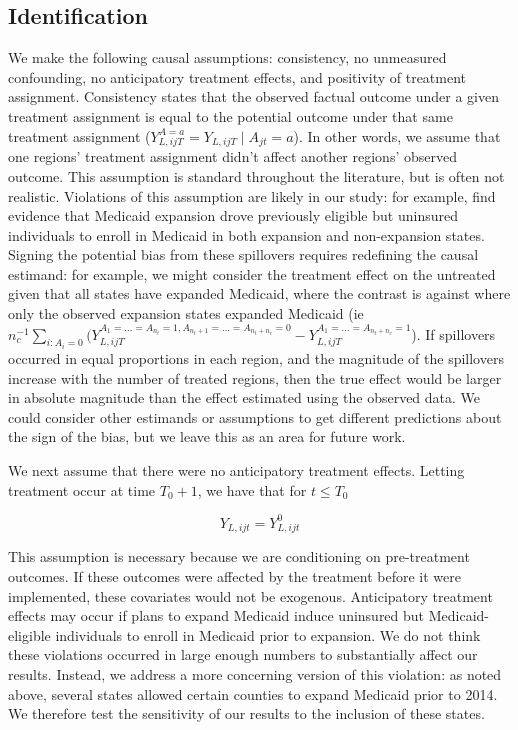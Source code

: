 \documentclass[12pt]{article}
\begin{document}
\subsection{Identification}

We make the following causal assumptions: consistency, no unmeasured confounding, no anticipatory treatment effects, and positivity of treatment assignment. Consistency states that the observed factual outcome under a given treatment assignment is equal to the potential outcome under that same treatment assignment ($Y_{L, ijT}^{A = a} = Y_{L, ijT} \mid A_{jt} = a$). In other words, we assume that one regions' treatment assignment didn't affect another regions' observed outcome. This assumption is standard throughout the literature, but is often not realistic. Violations of this assumption are likely in our study: for example, \cite{frean2017premium} find evidence that Medicaid expansion drove previously eligible but uninsured individuals to enroll in Medicaid in both expansion and non-expansion states. Signing the potential bias from these spillovers requires redefining the causal estimand: for example, we might consider the treatment effect on the untreated given that all states have expanded Medicaid, where the contrast is against where only the observed expansion states expanded Medicaid (ie $n_c^{-1}\sum_{i: A_i = 0}(Y_{L, ijT}^{A_1 = ... = A_{n_t} = 1, A_{n_t + 1} = ... = A_{n_t + n_c} = 0} - Y_{L, ijT}^{A_1 = ... = A_{n_t + n_c} = 1}$). If spillovers occurred in equal proportions in each region, and the magnitude of the spillovers increase with the number of treated regions, then the true effect would be larger in absolute magnitude than the effect estimated using the observed data. We could consider other estimands or assumptions to get different predictions about the sign of the bias, but we leave this as an area for future work.

We next assume that there were no anticipatory treatment effects. Letting treatment occur at time $T_0 + 1$, we have that for $t \le T_0$

$$
Y_{L, ijt} = Y_{L, ijt}^0
$$

This assumption is necessary because we are conditioning on pre-treatment outcomes. If these outcomes were affected by the treatment before it were implemented, these covariates would not be exogenous. Anticipatory treatment effects may occur if plans to expand Medicaid induce uninsured but Medicaid-eligible individuals to enroll in Medicaid prior to expansion. We do not think these violations occurred in large enough numbers to substantially affect our results. Instead, we address a more concerning version of this violation: as noted above, several states allowed certain counties to expand Medicaid prior to 2014. We therefore test the sensitivity of our results to the inclusion of these states.
\end{document}
